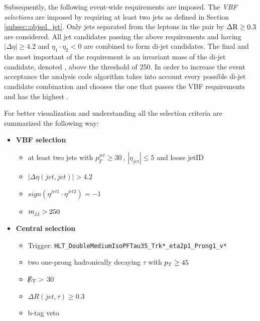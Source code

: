 Subsequently, the following event-wide requirements are imposed. The {\textit {VBF selections}} are imposed by requiring at least two jets as defined in Section \ref{subsec::objsel_jet}. Only jets separated from the leptons in the \hadtau\hadtau pair by $\Delta \text{R} \ge 0.3$ are considered. All jet candidates passing the above requirements and having $\vert \Delta\eta \vert \ge 4.2$ and $\eta_{1}\cdot\eta_{2} < 0$ are combined to form di-jet candidates. The final and the most important of the requirement is an invariant mass of the di-jet candidate, denoted \mjj, above the threshold of 250\gev. In order to increase the event acceptance the analysis code algorithm takes into account every possible di-jet candidate combination and chooses the one that passes the VBF requirements and has the highest \mjj. 

For better visualization and understanding all the selection criteria are summarized the following way:


\begin{itemize}
	\item \textbf{VBF selection}
	\begin{itemize}
		\item at least two jets with $p_{T}^{jet}\geq30~$\gev, $|\eta_{jet}|\leq5$ and loose jetID
		\item $|\Delta\eta(jet,jet)| > 4.2$
		\item $sign(\eta^{jet 1}\cdot\eta^{jet 2}) = -1$
		\item $m_{jj}>250~$\gev
	\end{itemize}
	\item \textbf{Central selection}
	\begin{itemize}
		\item Trigger: \texttt{HLT\_DoubleMediumIsoPFTau35\_Trk*\_eta2p1\_Prong1\_v*}
		\item two one-prong hadronically decaying $\tau$ with $p_{\text{T}}\geq45~$\gev 
		\item $\slash\mkern-12mu{E}_{\text{T}} > $ 30\gev
		\item $\Delta R(jet,\tau)\geq0.3$
		\item b-tag veto
	\end{itemize}
\end{itemize}


